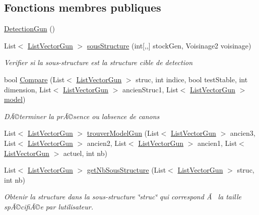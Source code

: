 \subsection*{Fonctions membres publiques}
\begin{DoxyCompactItemize}
\item 
\mbox{\hyperlink{class_detection_gun_a7fd1d6b8de83ef57d12bf0337833372b}{Detection\+Gun}} ()
\item 
List$<$ \mbox{\hyperlink{class_list_vector_gun}{List\+Vector\+Gun}} $>$ \mbox{\hyperlink{class_detection_gun_af804b47fcbcc2c89bbe17b47eb8f7c47}{sous\+Structure}} (int\mbox{[},,\mbox{]} stock\+Gen, Voisinage2 voisinage)
\begin{DoxyCompactList}\small\item\em Verifier si la sous-\/structure est la structure cible de detection \end{DoxyCompactList}\item 
bool \mbox{\hyperlink{class_detection_gun_a664491436b7ca39a34f4146754a6ae71}{Compare}} (List$<$ \mbox{\hyperlink{class_list_vector_gun}{List\+Vector\+Gun}} $>$ struc, int indice, bool test\+Stable, int dimension, List$<$ \mbox{\hyperlink{class_list_vector_gun}{List\+Vector\+Gun}} $>$ ancien\+Struc1, List$<$ \mbox{\hyperlink{class_list_vector_gun}{List\+Vector\+Gun}} $>$ \mbox{\hyperlink{class_detection_gun_a0c8ad0d86d7f0a02de8a120cffae1337}{model}})
\begin{DoxyCompactList}\small\item\em DÃ©terminer la prÃ©sence ou l\textquotesingle{}absence de canons \end{DoxyCompactList}\item 
List$<$ \mbox{\hyperlink{class_list_vector_gun}{List\+Vector\+Gun}} $>$ \mbox{\hyperlink{class_detection_gun_aaafe20e9ecbfe9e95e2f36ac49701d3d}{trouver\+Model\+Gun}} (List$<$ \mbox{\hyperlink{class_list_vector_gun}{List\+Vector\+Gun}} $>$ ancien3, List$<$ \mbox{\hyperlink{class_list_vector_gun}{List\+Vector\+Gun}} $>$ ancien2, List$<$ \mbox{\hyperlink{class_list_vector_gun}{List\+Vector\+Gun}} $>$ ancien1, List$<$ \mbox{\hyperlink{class_list_vector_gun}{List\+Vector\+Gun}} $>$ actuel, int nb)
\item 
List$<$ \mbox{\hyperlink{class_list_vector_gun}{List\+Vector\+Gun}} $>$ \mbox{\hyperlink{class_detection_gun_a0a14866d2727aea5d457121bd646f3bb}{get\+Nb\+Sous\+Structure}} (List$<$ \mbox{\hyperlink{class_list_vector_gun}{List\+Vector\+Gun}} $>$ struc, int nb)
\begin{DoxyCompactList}\small\item\em Obtenir la structure dans la sous-\/structure \char`\"{}struc\char`\"{} qui correspond Ã  la taille spÃ©cifiÃ©e par l\textquotesingle{}utilisateur. \end{DoxyCompactList}\item 

\end{DoxyCompactItemize}
